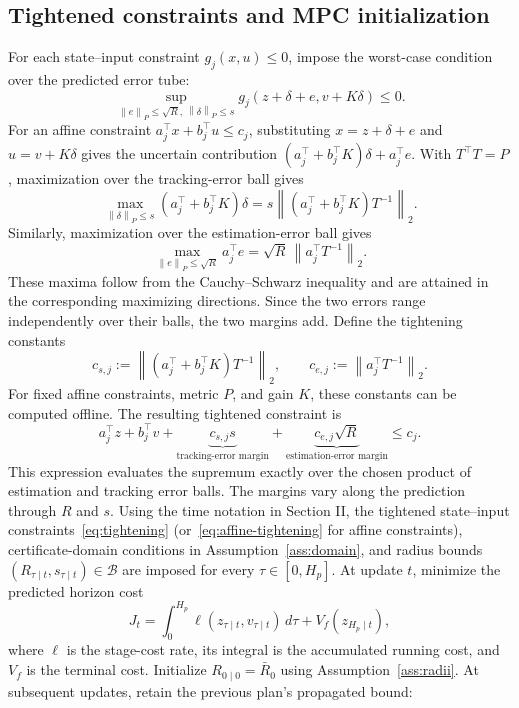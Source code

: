 \documentclass[11pt,a4paper]{article}
\numberwithin{equation}{section}
\theoremstyle{remark}\newtheorem{remark}{Remark}
\newcommand{\norm}[1]{\left\lVert#1\right\rVert}
\begin{document}
\subsection{Tightened constraints and MPC initialization}
For each state--input constraint $g_j(x,u)\le0$, impose the worst-case condition over the predicted error tube:
\begin{equation}\label{eq:tightening}
\sup_{\norm e_P\le\sqrt R,\ \norm\delta_P\le s}
 g_j(z+\delta+e,v+K\delta)\le0.
\end{equation}
For an affine constraint $a_j^\top x+b_j^\top u\le c_j$, substituting $x=z+\delta+e$ and $u=v+K\delta$ gives the uncertain contribution $(a_j^\top+b_j^\top K)\delta+a_j^\top e$. With $T^\top T=P$, maximization over the tracking-error ball gives
\[
\max_{\norm\delta_P\le s}(a_j^\top+b_j^\top K)\delta
=s\norm{(a_j^\top+b_j^\top K)T^{-1}}_2.
\]
Similarly, maximization over the estimation-error ball gives
\[
\max_{\norm e_P\le\sqrt R}a_j^\top e
=\sqrt R\,\norm{a_j^\top T^{-1}}_2.
\]
These maxima follow from the Cauchy--Schwarz inequality and are attained in the corresponding maximizing directions. Since the two errors range independently over their balls, the two margins add. Define the tightening constants
\[
c_{s,j}:=\norm{(a_j^\top+b_j^\top K)T^{-1}}_2,
\qquad c_{e,j}:=\norm{a_j^\top T^{-1}}_2.
\]
For fixed affine constraints, metric $P$, and gain $K$, these constants can be computed offline. The resulting tightened constraint is
\begin{equation}\label{eq:affine-tightening}
a_j^\top z+b_j^\top v
+\underbrace{c_{s,j}s}_{\text{tracking-error margin}}
+\underbrace{c_{e,j}\sqrt R}_{\text{estimation-error margin}}
\le c_j.
\end{equation}
This expression evaluates the supremum exactly over the chosen product of estimation and tracking error balls. The margins vary along the prediction through $R$ and $s$.
Using the time notation in Section II, the tightened state--input constraints~\eqref{eq:tightening} (or~\eqref{eq:affine-tightening} for affine constraints), certificate-domain conditions in Assumption~\ref{ass:domain}, and radius bounds $(R_{\tau\mid t},s_{\tau\mid t})\in\mathcal B$ are imposed for every $\tau\in[0,H_p]$.
At update $t$, minimize the predicted horizon cost
\begin{equation}\label{eq:cost}
J_t=\int_0^{H_p}\ell(z_{\tau\mid t},v_{\tau\mid t})\,d\tau+V_f(z_{H_p\mid t}),
\end{equation}
where $\ell$ is the stage-cost rate, its integral is the accumulated running cost, and $V_f$ is the terminal cost. Initialize $R_{0\mid 0}=\bar R_0$ using Assumption~\ref{ass:radii}. At subsequent updates, retain the previous plan's propagated bound:
\end{document}
